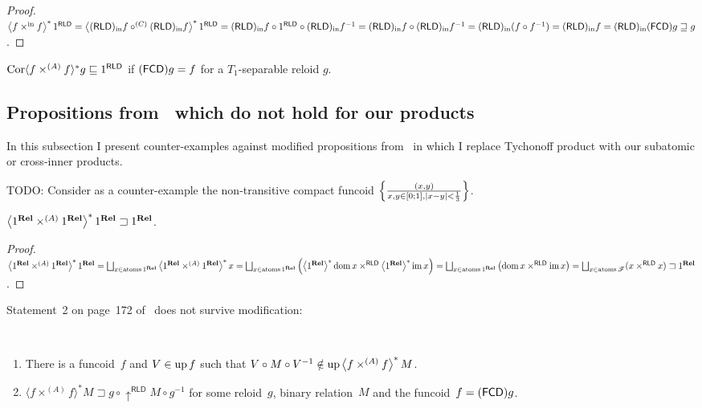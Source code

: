 \begin{proof}
$\left\langle f \times^{\mathrm{in}} f\right\rangle ^{\ast} 1^{\mathsf{RLD}} =
\left\langle (\mathsf{RLD})_{\mathrm{in}} f\circ^{(C)}(\mathsf{RLD})_{\mathrm{in}} f\right\rangle ^{\ast} 1^{\mathsf{RLD}} =
(\mathsf{RLD})_{\mathrm{in}} f\circ 1^{\mathsf{RLD}} \circ (\mathsf{RLD})_{\mathrm{in}} f^{-1} = 
(\mathsf{RLD})_{\mathrm{in}} f\circ (\mathsf{RLD})_{\mathrm{in}} f^{-1} = 
(\mathsf{RLD})_{\mathrm{in}} (f\circ f^{-1}) = (\mathsf{RLD})_{\mathrm{in}} f = (\mathsf{RLD})_{\mathrm{in}}(\mathsf{FCD}) g \sqsupseteq g$.
\end{proof}

\begin{lem}
  $\operatorname{Cor} \langle f \times^{(A)} f \rangle^{\ast} g \sqsubseteq 1^{\mathsf{RLD}}$ if
  $(\mathsf{FCD}) g = f$ for a $T_1$-separable reloid $g$.
\end{lem}

\subsection{Propositions from~\cite{bourb-top-1} which do not hold for our products}

In this subsection I present counter-examples against modified propositions from~\cite{bourb-top-1}
in which I replace Tychonoff product with our subatomic or cross-inner products.

TODO: Consider as a counter-example the non-transitive compact funcoid
$\left\{ \frac{(x,y)}{x,y\in [0;1], |x-y|<\frac{1}{3}}\right\}$.

\begin{example}
$\left\langle 1^{\mathbf{Rel}} \times^{(A)} 1^{\mathbf{Rel}}\right\rangle ^{\ast} 1^{\mathbf{Rel}} \sqsupset 1^{\mathbf{Rel}}$.
\end{example}

\begin{proof}
$\rsupfun{1^{\mathbf{Rel}} \times^{(A)} 1^{\mathbf{Rel}}} 1^{\mathbf{Rel}} =
\bigsqcup_{x\in\atoms 1^{\mathbf{Rel}}} \rsupfun{1^{\mathbf{Rel}} \times^{(A)} 1^{\mathbf{Rel}}} x =
\bigsqcup_{x\in\atoms 1^{\mathbf{Rel}}} \left( \rsupfun{1^{\mathbf{Rel}}} \dom x \times^{\mathsf{RLD}} \rsupfun{1^{\mathbf{Rel}}} \im x \right) =
\bigsqcup_{x\in\atoms 1^{\mathbf{Rel}}} \left( \dom x \times^{\mathsf{RLD}} \im x \right) =
\bigsqcup_{x\in\atoms \mathscr{F}} ( x \times^{\mathsf{RLD}} x ) \sqsupset
1^{\mathbf{Rel}}$.
\end{proof}

Statement~2 on page~172 of~\cite{bourb-top-1} does not survive modification:

\begin{example}
  ~
  \begin{enumerate}
    \item\label{vmv} There is a funcoid~$f$ and $V \in \operatorname{up} f$ such that
      $V \circ M \circ V^{- 1} \notin \operatorname{up} \left\langle f
      \times^{(A)} f \right\rangle ^{\ast} M$.
    \item\label{ffm} $\langle f \times^{(A)} f \rangle^{\ast} M \sqsupset g \circ
      \uparrow^{\mathsf{RLD}} M \circ g^{- 1}$ for some reloid~$g$, binary relation~$M$ and
      the funcoid~$f=(\mathsf{FCD}) g$.
  \end{enumerate}
\end{example}

